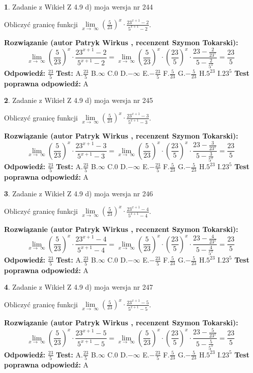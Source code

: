 \documentclass[12pt, a4paper]{article}
\theoremstyle{definition} %
\newtheorem{zad}{}
\newcommand{\zadStart}[1]{\begin{zad}#1\newline}
\newcommand{\zadStop}{\end{zad}}
\newcommand{\rozwStart}[2]{\noindent \textbf{Rozwiązanie (autor #1 , recenzent #2): }\newline}
\newcommand{\rozwStop}{\newline}
\newcommand{\odpStart}{\noindent \textbf{Odpowiedź:}\newline}
\newcommand{\odpStop}{\newline}
\newcommand{\testStart}{\noindent \textbf{Test:}\newline}
\newcommand{\testStop}{\newline}
\newcommand{\kluczStart}{\noindent \textbf{Test poprawna odpowiedź:}\newline}
\newcommand{\kluczStop}{\newline}
\begin{document}
\zadStart{Zadanie z Wikieł Z 4.9 d) moja wersja nr 244}


Obliczyć granicę funkcji  $\lim\limits_{x\to\ \infty}(\frac{5}{23})^{x}\cdot\frac{23^{x+1}-2}{5^{x+1}-2}$.
\zadStop
\rozwStart{Patryk Wirkus}{Szymon Tokarski}
$$\lim\limits_{x\to\ \infty}(\frac{5}{23})^{x}\cdot\frac{23^{x+1}-2}{5^{x+1}-2}=\lim\limits_{x\to\ \infty}(\frac{5}{23})^{x}\cdot(\frac{23}{5})^{x} \cdot \frac{23-\frac{2}{23^{x}}}{5-\frac{2}{5^{x}}} = \frac{23}{5}$$
\rozwStop
\odpStart
$\frac{23}{5}$
\odpStop
\testStart
A.$\frac{23}{5}$ B.$\infty$ C.$0$ D.$-\infty$ E.$-\frac{23}{5}$
F.$\frac{5}{23}$ G.$-\frac{5}{23}$
H.$5^{23}$
I.$23^{5}$
\testStop
\kluczStart
A
\kluczStop



\zadStart{Zadanie z Wikieł Z 4.9 d) moja wersja nr 245}


Obliczyć granicę funkcji  $\lim\limits_{x\to\ \infty}(\frac{5}{23})^{x}\cdot\frac{23^{x+1}-3}{5^{x+1}-3}$.
\zadStop
\rozwStart{Patryk Wirkus}{Szymon Tokarski}
$$\lim\limits_{x\to\ \infty}(\frac{5}{23})^{x}\cdot\frac{23^{x+1}-3}{5^{x+1}-3}=\lim\limits_{x\to\ \infty}(\frac{5}{23})^{x}\cdot(\frac{23}{5})^{x} \cdot \frac{23-\frac{3}{23^{x}}}{5-\frac{3}{5^{x}}} = \frac{23}{5}$$
\rozwStop
\odpStart
$\frac{23}{5}$
\odpStop
\testStart
A.$\frac{23}{5}$ B.$\infty$ C.$0$ D.$-\infty$ E.$-\frac{23}{5}$
F.$\frac{5}{23}$ G.$-\frac{5}{23}$
H.$5^{23}$
I.$23^{5}$
\testStop
\kluczStart
A
\kluczStop



\zadStart{Zadanie z Wikieł Z 4.9 d) moja wersja nr 246}


Obliczyć granicę funkcji  $\lim\limits_{x\to\ \infty}(\frac{5}{23})^{x}\cdot\frac{23^{x+1}-4}{5^{x+1}-4}$.
\zadStop
\rozwStart{Patryk Wirkus}{Szymon Tokarski}
$$\lim\limits_{x\to\ \infty}(\frac{5}{23})^{x}\cdot\frac{23^{x+1}-4}{5^{x+1}-4}=\lim\limits_{x\to\ \infty}(\frac{5}{23})^{x}\cdot(\frac{23}{5})^{x} \cdot \frac{23-\frac{4}{23^{x}}}{5-\frac{4}{5^{x}}} = \frac{23}{5}$$
\rozwStop
\odpStart
$\frac{23}{5}$
\odpStop
\testStart
A.$\frac{23}{5}$ B.$\infty$ C.$0$ D.$-\infty$ E.$-\frac{23}{5}$
F.$\frac{5}{23}$ G.$-\frac{5}{23}$
H.$5^{23}$
I.$23^{5}$
\testStop
\kluczStart
A
\kluczStop



\zadStart{Zadanie z Wikieł Z 4.9 d) moja wersja nr 247}


Obliczyć granicę funkcji  $\lim\limits_{x\to\ \infty}(\frac{5}{23})^{x}\cdot\frac{23^{x+1}-5}{5^{x+1}-5}$.
\zadStop
\rozwStart{Patryk Wirkus}{Szymon Tokarski}
$$\lim\limits_{x\to\ \infty}(\frac{5}{23})^{x}\cdot\frac{23^{x+1}-5}{5^{x+1}-5}=\lim\limits_{x\to\ \infty}(\frac{5}{23})^{x}\cdot(\frac{23}{5})^{x} \cdot \frac{23-\frac{5}{23^{x}}}{5-\frac{5}{5^{x}}} = \frac{23}{5}$$
\rozwStop
\odpStart
$\frac{23}{5}$
\odpStop
\testStart
A.$\frac{23}{5}$ B.$\infty$ C.$0$ D.$-\infty$ E.$-\frac{23}{5}$
F.$\frac{5}{23}$ G.$-\frac{5}{23}$
H.$5^{23}$
I.$23^{5}$
\testStop
\kluczStart
A
\kluczStop
\end{document}
